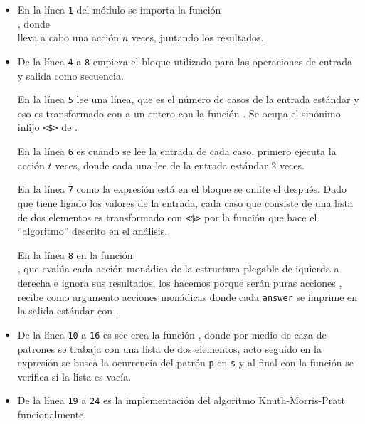 \begin{itemize}
\item En la línea \texttt{1} del módulo  se importa la función\\
, donde\\ 
lleva a cabo una acción $n$ veces, juntando los resultados.

\item De la línea \texttt{4} a \texttt{8} empieza el bloque  utilizado para las
operaciones de entrada y salida como secuencia.

En la línea \texttt{5} lee una línea, que es el número de casos de la entrada estándar y eso es
transformado con  a un entero con la función
. Se ocupa el sinónimo infijo \texttt{<\$>} de .

En la línea \texttt{6} es cuando se lee la entrada de cada caso, primero 
ejecuta la acción  $t$ veces, donde cada una lee de la entrada
estándar 2 veces.

En la línea \texttt{7} como la expresión  está en el bloque  se omite el
 después. Dado que  tiene ligado los valores de la entrada, cada caso que
consiste de una lista de dos elementos es transformado con \texttt{<\$>} por la función
 que hace el ``algoritmo'' descrito en el análisis.

En la línea \texttt{8} en la función\\
, que evalúa cada acción monádica de
la estructura plegable de iquierda a derecha e ignora sus resultados, los hacemos porque serán
puras acciones ,  recibe como argumento acciones monádicas donde
cada \texttt{answer} se imprime en la salida estándar con . 

\item De la línea \texttt{10} a \texttt{16} es see crea la función
, donde por medio de caza de patrones se trabaja con una
lista de dos elementos, acto seguido en la expresión  se busca la ocurrencia
del patrón \texttt{p} en \texttt{s} y al final con la función
 se verifica si la lista es vacía.  

\item De la línea \texttt{19} a \texttt{24} es la implementación del algoritmo Knuth-Morris-Pratt
funcionalmente.
\end{itemize}

